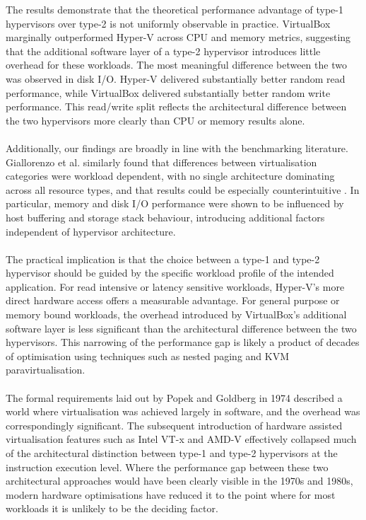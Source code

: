 \documentclass[a4paper, 12pt]{article}
\theoremstyle{plain}
\theoremstyle{definition}
\theoremstyle{remark}
\begin{document}
    The results demonstrate that the theoretical performance advantage of type-1 
    hypervisors over type-2 is not uniformly observable in practice. VirtualBox 
    marginally outperformed Hyper-V across CPU and memory metrics, suggesting that 
    the additional software layer of a type-2 hypervisor introduces little overhead 
    for these workloads. The most meaningful difference between the two was observed 
    in disk I/O. Hyper-V delivered substantially better random read performance, 
    while VirtualBox delivered substantially better random write performance. 
    This read/write split reflects the architectural difference between the two 
    hypervisors more clearly than CPU or memory results alone.\\
    \\
    \noindent Additionally, our findings are broadly in line with the benchmarking literature. 
    Giallorenzo et al. similarly found that differences between virtualisation categories were 
    workload dependent, with no single architecture dominating across all resource types, 
    and that results could be especially counterintuitive \parencite{giallorenzoVirtualizationCostsBenchmarking2021}.
    In particular, memory and disk I/O performance were shown to be influenced by 
    host buffering and storage stack behaviour, introducing additional factors 
    independent of hypervisor architecture.\\
    \\
    \noindent The practical implication is that the choice between a type-1 and type-2 
    hypervisor should be guided by the specific workload profile of the intended 
    application. For read intensive or latency sensitive workloads, Hyper-V's more 
    direct hardware access offers a measurable advantage. For general purpose or memory 
    bound workloads, the overhead introduced by VirtualBox's additional software layer 
    is less significant than the architectural difference between the two hypervisors. 
    This narrowing of the performance gap is likely a product of decades of optimisation 
    using techniques such as nested paging and KVM paravirtualisation.\\
    \\
    \noindent The formal requirements laid out by Popek and Goldberg \parencite{popekFormalRequirementsVirtualizable1974} 
    in 1974 described a world where virtualisation was achieved largely in software, and 
    the overhead was correspondingly significant. The subsequent introduction of 
    hardware assisted virtualisation features such as Intel VT-x and AMD-V effectively 
    collapsed much of the architectural distinction between type-1 and type-2 hypervisors 
    at the instruction execution level. Where the performance gap between these two 
    architectural approaches would have been clearly visible in the 1970s and 1980s, 
    modern hardware optimisations have reduced it to the point where for most workloads
    it is unlikely to be the deciding factor.
\end{document}
